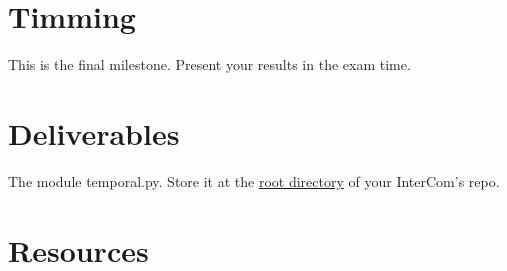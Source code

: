\section{Timming}

This is the final milestone. Present your results in the exam time.

\section{Deliverables}

The module temporal.py. Store it at the
\href{https://github.com/Tecnologias-multimedia/intercom}{root
  directory} of your InterCom's repo.

\section{Resources}



\begin{comment}

  The Figure~\ref{fig:transform_coding} shows the stages that are
  tipycally involved in a transform-based signal compression system.

\begin{figure}
  \begin{center}
\begin{verbatim}
   s   +---+   w    +---+   k    +---+    c
 ----->| T |------->| Q |------->| E |-----------+
  (s)  +---+  (s)   +---+  (~s)  +---+   (~s)    |
samples   coefficients   indexes      code-words ~
                                                 :
                                                 ~
   ~s  +---+    w   +---+   k    +---+           |
 <-----| t |<-------| q |<-------| D |<----------+
  (~s) +---+  (~s)  +---+  (~s)  +---+
approx.    quantized     indexes
samples   coefficients
\end{verbatim}                
  \end{center}
  \caption{Common data-flow used un Transform Coding. $s$ represents
    the signal to compress, $\tilde{s}$ the lossy version of the
    reconstructed signal, $T$ the (forward) transform (which takes blocks of
    samples) producing blocks of coefficients $w$, $Q$ the scalar
    quantization stage (which takes single coefficients) producing
    quantization indexes $k$, $E$ the entropy encoder (which in our
    case (DEFLATE) works with blocks of coefficients) producing
    code-words $c$, $D$ the entropy decoder, $q$ the decuantization
    stage, and $t$ the inverse (or backward) transform. PCM stands for Puse Code
    Modulation and DEFLATE is the technique used to find a compact
    representation of the quantized coefficients.}
  \label{fig:transform_coding}
\end{figure}
\end{comment}

